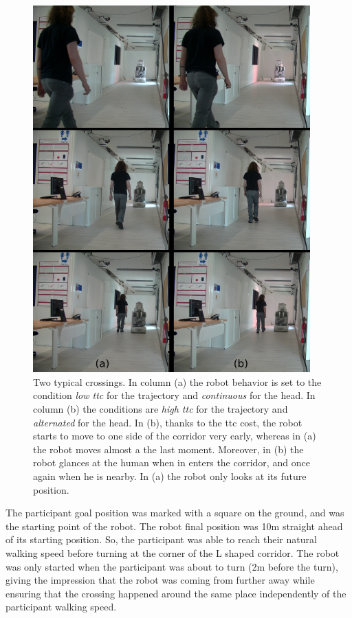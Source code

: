 \documentclass[a4paper,11pt,twoside]{StyleThese}
\begin{document}
\begin{figure}[hbtp]
\centering
\includegraphics[width=0.95\textwidth]{figures/chapter2/Chap2ExpeReal.png}
\caption{Two typical crossings. In column (a) the robot behavior is set to the condition \textit{low \acrshort{ttc}} for the trajectory and \textit{continuous} for the head. In column (b) the conditions are \textit{high \acrshort{ttc}} for the trajectory and \textit{alternated} for the head. In (b), thanks to the \acrshort{ttc} cost, the robot starts to move to one side of the corridor very early, whereas in (a) the robot moves almost a the last moment. Moreover, in (b) the robot glances at the human when in enters the corridor, and once again when he is nearby. In (a) the robot only looks at its future position.}
\label{fig:realttc}
\end{figure}

The participant goal position was marked with a square on the ground, and was the starting point of the robot. The robot final position was 10m straight ahead of its starting position. So, the participant was able to reach their natural walking speed before turning at the corner of the L shaped corridor. The robot was only started when the participant was about to turn (2m before the turn), giving the impression that the robot was coming from further away while ensuring that the crossing happened around the same place independently of the participant walking speed.
\end{document}
